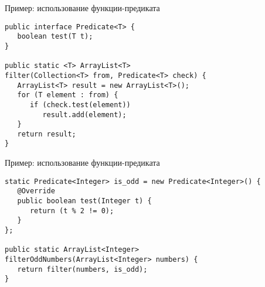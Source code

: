 \documentclass[aspectratio=169]{beamer}
\begin{document}
\begin{frame}[fragile]{Пример: использование функции-предиката}
	\begin{verbatim}
public interface Predicate<T> {
   boolean test(T t);
}

public static <T> ArrayList<T> 
filter(Collection<T> from, Predicate<T> check) {
   ArrayList<T> result = new ArrayList<T>();
   for (T element : from) {
      if (check.test(element))
         result.add(element);
   }
   return result;
}
	\end{verbatim}
\end{frame}

\begin{frame}[fragile]{Пример: использование функции-предиката}
	\begin{verbatim}
static Predicate<Integer> is_odd = new Predicate<Integer>() { 
   @Override
   public boolean test(Integer t) {
      return (t % 2 != 0);
   }
};

public static ArrayList<Integer> 
filterOddNumbers(ArrayList<Integer> numbers) {
   return filter(numbers, is_odd);
}
	\end{verbatim}
\end{frame}
\end{document}
